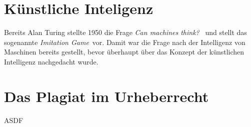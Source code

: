 \documentclass{article}
\begin{document}
\section{Künstliche Inteligenz}
Bereits Alan Turing stellte 1950 die Frage \glqq \textit{Can machines think?}\grqq~\autocite[\ppno~433]{turingCOMPUTINGMACHINERYINTELLIGENCE1950} und stellt das sogenannte \glqq \textit{Imitation Game}\grqq~vor. Damit war die Frage nach der Intelligenz von Maschinen bereits gestellt, bevor überhaupt über das Konzept der künstlichen Intelligenz nachgedacht wurde\autocite[\ppno~10]{laemmelKuenstlicheIntelligenzWissensverarbeitung2023}. 
\section{Das Plagiat im Urheberrecht}

ASDF
\printbibliography
\end{document}
